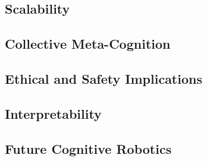 \documentclass[a4paper]{article}
\begin{document}
	\subsection{Scalability}
	\subsection{Collective Meta-Cognition}
	\subsection{Ethical and Safety Implications}
	\subsection{Interpretability}
	\subsection{Future Cognitive Robotics}
\end{document}
